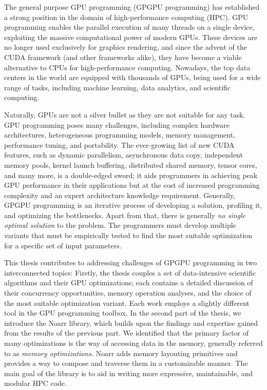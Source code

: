 
The general purpose GPU programming (GPGPU programming) has established a strong position in the domain of high-performance computing (HPC).
GPU programming enables the parallel execution of many threads on a single device, exploiting the massive computational power of modern GPUs.
These devices are no longer used exclusively for graphics rendering, and since the advent of the CUDA framework (and other frameworks alike), they have become a viable alternative to CPUs for high-performance computing.
Nowadays, the top data centers in the world are equipped with thousands of GPUs, being used for a wide range of tasks, including machine learning, data analytics, and scientific computing.

Naturally, GPUs are not a silver bullet as they are not suitable for any task.
GPU programming poses many challenges, including complex hardware architectures, heterogeneous programming models, memory management, performance tuning, and portability.
The ever-growing list of new CUDA features, such as dynamic parallelism, asynchronous data copy, independent memory pools, kernel launch buffering, distributed shared memory, tensor cores, and many more, is a double-edged sword;
it aids programmers in achieving peak GPU performance in their applications but at the cost of increased programming complexity and an expert architecture knowledge requirement.
Generally, GPGPU programming is an iterative process of developing a solution, profiling it, and optimizing the bottlenecks.
Apart from that, there is generally \emph{no single optimal solution} to the problem. The programmers must develop multiple variants that must be empirically tested to find the most suitable optimization for a specific set of input parameters.

This thesis contributes to addressing challenges of GPGPU programming in two interconnected topics:
Firstly, the thesis couples a set of data-intensive scientific algorithms and their GPU optimizations; each contains a detailed discussion of their concurrency opportunities, memory operation analyses, and the choice of the most suitable optimization variant. Each work employs a slightly different tool in the GPU programming toolbox.
In the second part of the thesis, we introduce the Noarr library, which builds upon the findings and expertise gained from the results of the previous part. We identified that the primary factor of many optimizations is the way of accessing data in the memory, generally referred to as \emph{memory optimizations}.
Noarr adds memory layouting primitives and provides a way to compose and traverse them in a customizable manner. The main goal of the library is to aid in writing more expressive, maintainable, and modular HPC code.

